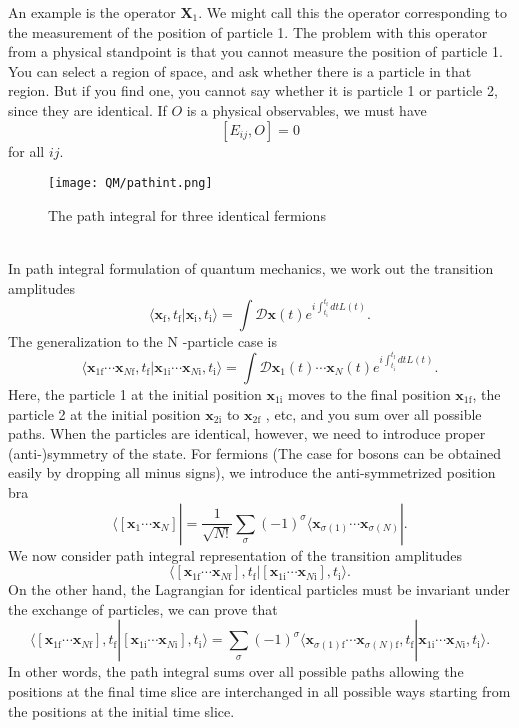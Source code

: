 An example is the operator $\bm{X}_1$. We might call this the operator corresponding to the measurement of the position of
particle 1. 
The problem with this operator from a physical standpoint is that you cannot measure the position of particle 1. You can select a region of space, and ask whether there is a particle in that region. But if you find one, you cannot say whether it is particle 1 or particle 2, since they are identical. 
If $O$ is a physical observables, we must have
\[[E_{ij},O] = 0\]
for all $ij$.
\begin{figure}[!h]
	\centering
	\texttt{[image: QM/pathint.png]}
	\caption{The path integral for three identical fermions}
\end{figure}\\
In path integral formulation of quantum mechanics, we work out the transition amplitudes
\[\langle \bm{x}_{\mathrm{f}},t_{\mathrm{f}} | \bm{x}_{\mathrm{i}},t_{\mathrm{i}}\rangle = \int \mathcal{D}\bm{x}(t) e^{i\int_{t_{\mathrm{i}}}^{t_{\mathrm{f}}} dt L(t)}.\]
The generalization to the N -particle case is
\[\langle \bm{x}_{1\mathrm{f}}\cdots\bm{x}_{N\mathrm{f}},t_{\mathrm{f}} | \bm{x}_{1\mathrm{i}}\cdots\bm{x}_{N\mathrm{i}},t_{\mathrm{i}}\rangle = \int \mathcal{D}\bm{x}_1(t)\cdots\bm{x}_N(t) e^{i\int_{t_{\mathrm{i}}}^{t_{\mathrm{f}}} dt L(t)}.\]
Here, the particle 1 at the initial position $\bm{x}_{1\mathrm{i}}$ moves to the final position $\bm{x}_{1\mathrm{f}}$, the particle 2 at the initial position $\bm{x}_{2\mathrm{i}}$ to $\bm{x}_{2\mathrm{f}}$ , etc, and you sum over all possible paths.
When the particles are identical, however, we need to introduce proper (anti-)symmetry of the state. For fermions (The case for bosons can be obtained easily by dropping all minus signs), we introduce the anti-symmetrized position bra
\[\langle [\bm{x}_1\cdots\bm{x}_N]| = \frac{1}{\sqrt{N!}} \sum_{\sigma} (-1)^{\sigma} \langle \bm{x}_{\sigma(1)}\cdots\bm{x}_{\sigma(N)}|.\]
We now consider path integral representation of the transition amplitudes
\[\langle [\bm{x}_{1\mathrm{f}}\cdots\bm{x}_{N\mathrm{f}}],t_{\mathrm{f}} | [\bm{x}_{1\mathrm{i}}\cdots\bm{x}_{N\mathrm{i}}],t_{\mathrm{i}}\rangle.\]
On the other hand, the Lagrangian for identical particles must be invariant under the exchange of particles, we can prove that
\[\langle [\bm{x}_{1\mathrm{f}}\cdots\bm{x}_{N\mathrm{f}}],t_{\mathrm{f}} | [\bm{x}_{1\mathrm{i}}\cdots\bm{x}_{N\mathrm{i}}],t_{\mathrm{i}}\rangle = \sum_{\sigma} (-1)^{\sigma}  \langle \bm{x}_{\sigma(1)\mathrm{f}}\cdots\bm{x}_{\sigma(N)\mathrm{f}},t_{\mathrm{f}} | \bm{x}_{1\mathrm{i}}\cdots\bm{x}_{N\mathrm{i}},t_{\mathrm{i}}\rangle.\]
In other words, the path integral sums over all possible paths allowing the positions at the final time slice are interchanged in all possible ways starting from the positions at the initial time slice.

